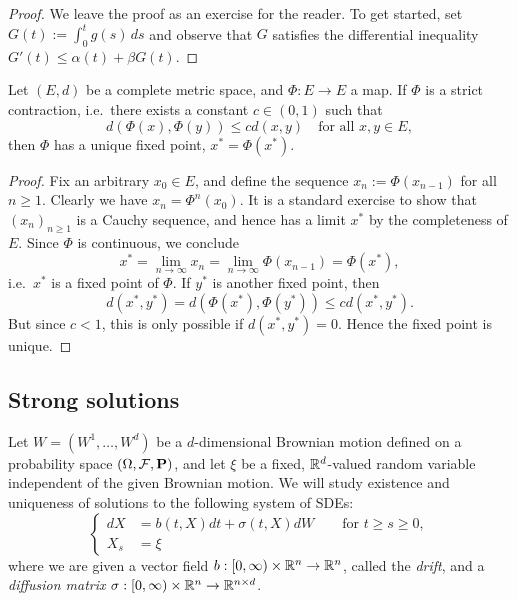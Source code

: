 \begin{proof}
	We leave the proof as an exercise for the reader. To get started, set $G(t):=\int_0^t g(s)\,ds$ and observe that $G$ satisfies the differential inequality $G'(t)\le \alpha(t)+\beta G(t)$.
\end{proof}

\begin{theorem}
	Let $(E,d)$ be a complete metric space, and $\Phi:E\to E$ a map. If $\Phi$ is a strict contraction, i.e.\ there exists a constant $c\in (0,1)$ such that
	\begin{equation*}
		d(\Phi(x),\Phi(y))\le cd(x,y) \quad\text{for all }x,y\in E,
	\end{equation*}
	then $\Phi$ has a unique fixed point, $x^* = \Phi(x^*)$.
\end{theorem}

\begin{proof}
	Fix an arbitrary $x_0\in E$, and define the sequence $x_n := \Phi (x_{n-1})$ for all $n\ge 1$. Clearly we have $x_n=\Phi^n(x_0)$. It is a standard exercise to show that $(x_n)_{n\ge 1}$ is a Cauchy sequence, and hence has a limit $x^*$ by the completeness of $E$. Since $\Phi$ is continuous, we conclude
	\begin{equation*}
		x^* = \lim_{n\to\infty}x_n = \lim_{n\to\infty}\Phi(x_{n-1}) = \Phi(x^*),
	\end{equation*}
	i.e.\ $x^*$ is a fixed point of $\Phi$. If $y^*$ is another fixed point, then
	\begin{equation*}
		d(x^*,y^*) = d(\Phi(x^*),\Phi(y^*)) \le cd(x^*,y^*).
	\end{equation*}
	But since $c<1$, this is only possible if $d(x^*,y^*)=0$. Hence the fixed point is unique.
\end{proof}

\subsection{Strong solutions}

Let $W=(W^1,\ldots,W^d)$ be a $d$-dimensional Brownian motion defined on a probability space $(\Omega,\mathcal{F},\mathbf{P})$, and let $\xi$ be a fixed, $\mathbb{R}^d$-valued random variable independent of the given Brownian motion. We will study existence and uniqueness of solutions to the following system of SDEs:
\begin{equation}
	\label{eq:SDE}
	\left\{
	\begin{aligned}
		dX &= b(t,X)dt + \sigma(t,X)dW \qquad\text{for }t\ge s\ge 0, \\
		X_s &= \xi
	\end{aligned}
	\right.
\end{equation}
where we are given a vector field $b:[0,\infty)\times\mathbb{R}^n\to\mathbb{R}^n$, called the \emph{drift}, and a \emph{diffusion matrix} $\sigma:[0,\infty)\times\mathbb{R}^n\to\mathbb{R}^{n\times d}$.


